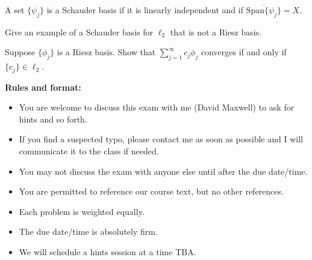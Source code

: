 \begin{aproblems}
A set $\{\psi_j\}$ is a Schauder basis if it is linearly independent
and if $\overline{\mathrm{Span}\{\psi_j\}}=X$.

\begin{subproblems}
\item Give an example of a Schauder basis  for $\ell_2$ that is not a Riesz basis.
\item Suppose $\{\phi_j\}$ is a Riesz basis.  Show that $\sum_{j=1}^\infty c_j\phi_j$ converges if and only if $\{c_j\}\in\ell_2$.
\end{subproblems}

\newpage
{\bf  Rules and format:}
\begin{itemize}

\item You are welcome to discuss this exam with me (David Maxwell) to ask for hints and so forth.
\item  If you find a suspected typo, please contact me as soon as possible and I will
communicate it to the class if needed.
\item You may not discuss the exam with anyone else until after the due date/time.
\item You are permitted to reference our course text, but no other references.
\item Each problem is weighted equally.
\item The due date/time is absolutely firm.
\item We will schedule a hints session at a time TBA.
\end{itemize}




\end{aproblems}
